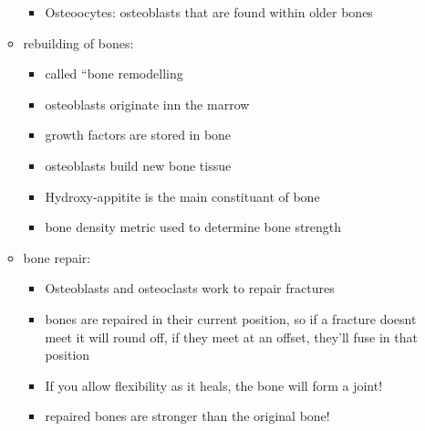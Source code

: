 \documentclass{article}
\theoremstyle{definition}
\begin{document}
\begin{itemize}
\begin{itemize}
\begin{itemize}
					\item Osteoocytes: osteoblasts that are found within older bones
				\end{itemize}
			\item rebuilding of bones:
				\begin{itemize}
					\item called ``bone remodelling
					\item osteoblasts originate inn the marrow
					\item growth factors are stored in bone
					\item osteoblasts build new bone tissue
					\item Hydroxy-appitite is the main constituant of bone
					\item bone density metric used to determine bone strength
				\end{itemize}
			\item bone repair:
				\begin{itemize}
					\item Osteoblasts and osteoclasts work to repair fractures
					\item bones are repaired in their current position, so if a fracture doesnt meet it will round off, if they meet at an offset, they'll fuse in that position
					\item If you allow flexibility as it heals, the bone will form a joint!
					\item repaired bones are stronger than the original bone!
				\end{itemize}
		\end{itemize}
\end{itemize}
\end{document}
